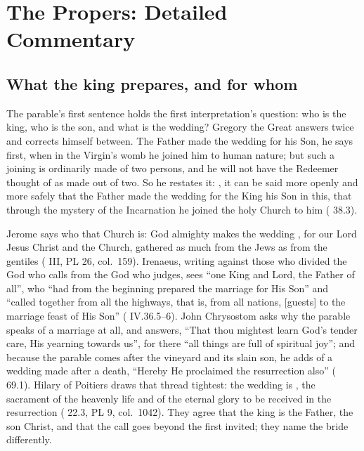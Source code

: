 
\section{The Propers: Detailed Commentary}

\subsection{What the king prepares, and for whom}

The parable's first sentence holds the first interpretation's question: who
is the king, who is the son, and what is the wedding? Gregory the Great
answers twice and corrects himself between. The Father made the wedding for
his Son, he says first, when in the Virgin's womb he joined him to human
nature; but such a joining is ordinarily made of two persons, and he will not
have the Redeemer thought of as made out of two. So he restates it:
, it can be said more openly and more safely that the Father made the
wedding for the King his Son in this, that through the mystery of the
Incarnation he joined the holy Church to him (
38.3).

Jerome says who that Church is: God almighty makes the wedding , for our Lord Jesus Christ and the Church, gathered as much
from the Jews as from the gentiles ( III, PL 26,
col.~159). Irenaeus, writing against those who divided the God who calls from
the God who judges, sees ``one King and Lord, the Father of all'', who ``had
from the beginning prepared the marriage for His Son'' and ``called together
from all the highways, that is, from all nations, [guests] to the marriage
feast of His Son'' ( IV.36.5--6). John Chrysostom asks
why the parable speaks of a marriage at all, and answers, ``That thou mightest
learn God's tender care, His yearning towards us'', for there ``all things are
full of spiritual joy''; and because the parable comes after the vineyard and
its slain son, he adds of a wedding made after a death, ``Hereby He proclaimed
the resurrection also'' ( 69.1). Hilary of Poitiers
draws that thread tightest: the wedding is , the sacrament of the
heavenly life and of the eternal glory to be received in the resurrection
( 22.3, PL 9, col.~1042). They agree that the
king is the Father, the son Christ, and that the call goes beyond the first
invited; they name the bride differently.

